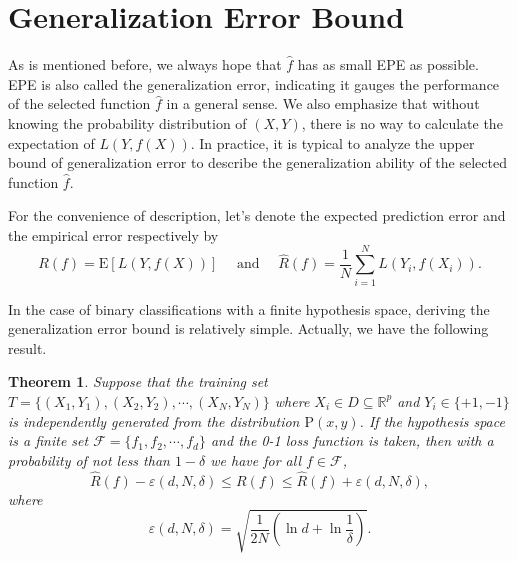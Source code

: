 \documentclass{report}
\newtheorem{theorem}{Theorem}[chapter]
\theoremstyle{nonumberplain}
\newcommand{\0}{\mathbf{0}}
\begin{document}
\section{Generalization Error Bound}

As is mentioned before, we always hope that $\hat{f}$ has as small EPE as possible. EPE is also called the generalization error, indicating it gauges the performance of the selected function $\hat{f}$ in a general sense. We also emphasize that without knowing the probability distribution of $(X,Y)$, there is no way to calculate the expectation of $L(Y,f(X))$. In practice, it is typical to analyze the upper bound of generalization error to describe the generalization ability of the selected function $\hat{f}$. 

For the convenience of description, let's denote the expected prediction error and the empirical error respectively by
\[
R(f)=\mathrm{E}[L(Y,f(X))]\quad\text{ and }\quad\widehat{R}(f)=\frac{1}{N} \sum_{i=1}^{N} L\left(Y_{i}, f\left(X_{i}\right)\right).
\]

In the case of binary classifications with a finite hypothesis space, deriving the generalization error bound is relatively simple. Actually, we have the following result.

\begin{theorem}
	Suppose that the training set $T=\{(X_1,Y_1),(X_2,Y_2),\cdots,(X_{N},Y_{N})\}$ where $X_i\in D\subseteq\mathbb{R}^p$ and $Y_i\in\{+1,-1\}$ is  independently generated from the distribution $\mathrm{P}(x,y)$. If the hypothesis space is a finite set $\mathcal{F}=\{f_1,f_2,\cdots,f_d\}$ and the 0-1 loss function is taken, then  with a probability of not less than $1-\delta$ we have for all $f\in \mathcal{F}$,
	\[
	\widehat{R}(f)-\varepsilon(d, N, \delta)\le R(f) \le \widehat{R}(f)+\varepsilon(d, N, \delta),
	\]
	where 
	\[
	\varepsilon(d, N, \delta)=\sqrt{\frac{1}{2 N}\left(\ln d+\ln \frac{1}{\delta}\right)}.
	\]
\end{theorem}
\end{document}
